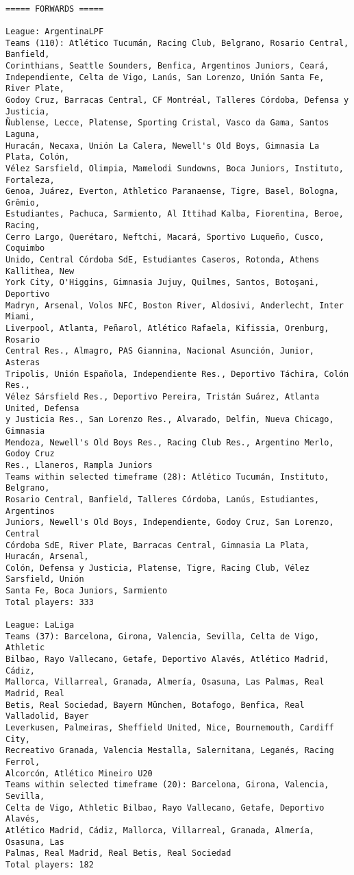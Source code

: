 \documentclass[11pt]{article}
\begin{document}
    \begin{Verbatim}[commandchars=\\\{\}]

===== FORWARDS =====

League: ArgentinaLPF
Teams (110): Atlético Tucumán, Racing Club, Belgrano, Rosario Central, Banfield,
Corinthians, Seattle Sounders, Benfica, Argentinos Juniors, Ceará,
Independiente, Celta de Vigo, Lanús, San Lorenzo, Unión Santa Fe, River Plate,
Godoy Cruz, Barracas Central, CF Montréal, Talleres Córdoba, Defensa y Justicia,
Ñublense, Lecce, Platense, Sporting Cristal, Vasco da Gama, Santos Laguna,
Huracán, Necaxa, Unión La Calera, Newell's Old Boys, Gimnasia La Plata, Colón,
Vélez Sarsfield, Olimpia, Mamelodi Sundowns, Boca Juniors, Instituto, Fortaleza,
Genoa, Juárez, Everton, Athletico Paranaense, Tigre, Basel, Bologna, Grêmio,
Estudiantes, Pachuca, Sarmiento, Al Ittihad Kalba, Fiorentina, Beroe, Racing,
Cerro Largo, Querétaro, Neftchi, Macará, Sportivo Luqueño, Cusco, Coquimbo
Unido, Central Córdoba SdE, Estudiantes Caseros, Rotonda, Athens Kallithea, New
York City, O'Higgins, Gimnasia Jujuy, Quilmes, Santos, Botoşani, Deportivo
Madryn, Arsenal, Volos NFC, Boston River, Aldosivi, Anderlecht, Inter Miami,
Liverpool, Atlanta, Peñarol, Atlético Rafaela, Kifissia, Orenburg, Rosario
Central Res., Almagro, PAS Giannina, Nacional Asunción, Junior, Asteras
Tripolis, Unión Española, Independiente Res., Deportivo Táchira, Colón Res.,
Vélez Sársfield Res., Deportivo Pereira, Tristán Suárez, Atlanta United, Defensa
y Justicia Res., San Lorenzo Res., Alvarado, Delfin, Nueva Chicago, Gimnasia
Mendoza, Newell's Old Boys Res., Racing Club Res., Argentino Merlo, Godoy Cruz
Res., Llaneros, Rampla Juniors
Teams within selected timeframe (28): Atlético Tucumán, Instituto, Belgrano,
Rosario Central, Banfield, Talleres Córdoba, Lanús, Estudiantes, Argentinos
Juniors, Newell's Old Boys, Independiente, Godoy Cruz, San Lorenzo, Central
Córdoba SdE, River Plate, Barracas Central, Gimnasia La Plata, Huracán, Arsenal,
Colón, Defensa y Justicia, Platense, Tigre, Racing Club, Vélez Sarsfield, Unión
Santa Fe, Boca Juniors, Sarmiento
Total players: 333

League: LaLiga
Teams (37): Barcelona, Girona, Valencia, Sevilla, Celta de Vigo, Athletic
Bilbao, Rayo Vallecano, Getafe, Deportivo Alavés, Atlético Madrid, Cádiz,
Mallorca, Villarreal, Granada, Almería, Osasuna, Las Palmas, Real Madrid, Real
Betis, Real Sociedad, Bayern München, Botafogo, Benfica, Real Valladolid, Bayer
Leverkusen, Palmeiras, Sheffield United, Nice, Bournemouth, Cardiff City,
Recreativo Granada, Valencia Mestalla, Salernitana, Leganés, Racing Ferrol,
Alcorcón, Atlético Mineiro U20
Teams within selected timeframe (20): Barcelona, Girona, Valencia, Sevilla,
Celta de Vigo, Athletic Bilbao, Rayo Vallecano, Getafe, Deportivo Alavés,
Atlético Madrid, Cádiz, Mallorca, Villarreal, Granada, Almería, Osasuna, Las
Palmas, Real Madrid, Real Betis, Real Sociedad
Total players: 182


\end{Verbatim}
\end{document}
